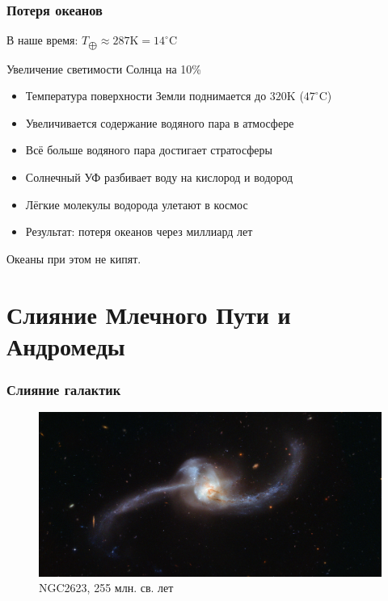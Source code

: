 \documentclass[aspectratio=169]{beamer}
\begin{document}
\begin{frame}
\frametitle{Потеря океанов}
В наше время: $T_{\bigoplus} \approx 287 \mathrm{K} = 14^\circ \mathrm{C}$
\begin{block}{Увеличение светимости Солнца на 10\%}
\begin{itemize}
\item Температура поверхности Земли поднимается до $320 \mathrm{K}$ ($47^\circ \mathrm{C}$)
\item Увеличивается содержание водяного пара в атмосфере
\item Всё больше водяного пара достигает стратосферы
\item Солнечный УФ разбивает воду на кислород и водород
\item Лёгкие молекулы водорода улетают в космос
\item Результат: потеря океанов через миллиард лет \cite{James F. Kasting}
\end{itemize}
Океаны при этом не кипят.
\end{block}
\end{frame}


\section{Слияние Млечного Пути и Андромеды}
\begin{frame}
\frametitle{Слияние галактик}
\begin{figure}
\includegraphics[width=\textwidth]{img/NGC2623.jpg}
\captionsetup{labelformat=empty}
\caption{NGC2623, 255 млн. св. лет}
\end{figure}
\end{frame}
\end{document}
